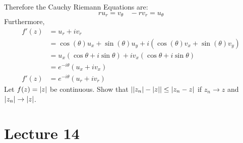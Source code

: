 \documentclass[12pt]{article}
\begin{document}
 Therefore the Cauchy Riemann Equations are: $$ ru_r = v_\theta ~~~~ -rv_r = u_\theta $$ 
 Furthermore, $$ \begin{aligned} f'(z) &= u_r + iv_r \\ &= \cos(\theta)u_x + \sin(\theta)u_y + i(\cos(\theta)v_x + \sin(\theta)v_y) \\ &= u_x(\cos \theta + i\sin \theta) + iv_x(\cos \theta + i\sin \theta) \\ &= e^{-i\theta}(u_x + iv_x) \\ f'(z) &= e^{-i\theta}(u_r + iv_r) \end{aligned} $$ 
 Let $f(z) = \abs{z}$ be continuous. Show that $\abs{ \abs{z_n} - \abs{z}} \leq \abs{z_n - z}$ if $z_n \to z$ and $\abs{z_n} \to \abs{z}$. 


\section{Lecture 14} 
\end{document}

